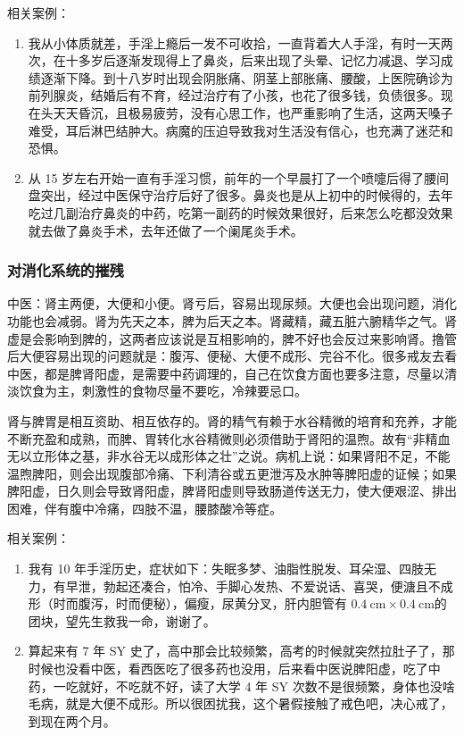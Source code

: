 \documentclass[fontset=founder]{ctexart}
\begin{document}
相关案例：

\begin{enumerate}
    \item 我从小体质就差，手淫上瘾后一发不可收拾，一直背着大人手淫，有时一天两次，在十多岁后逐渐发现得上了鼻炎，后来出现了头晕、记忆力减退、学习成绩逐渐下降。到十八岁时出现会阴胀痛、阴茎上部胀痛、腰酸，上医院确诊为前列腺炎，结婚后有不育，经过治疗有了小孩，也花了很多钱，负债很多。现在头天天昏沉，且极易疲劳，没有心思工作，也严重影响了生活，这两天嗓子难受，耳后淋巴结肿大。病魔的压迫导致我对生活没有信心，也充满了迷茫和恐惧。
    \item 从 15 岁左右开始一直有手淫习惯，前年的一个早晨打了一个喷嚏后得了腰间盘突出，经过中医保守治疗后好了很多。鼻炎也是从上初中的时候得的，去年吃过几副治疗鼻炎的中药，吃第一副药的时候效果很好，后来怎么吃都没效果就去做了鼻炎手术，去年还做了一个阑尾炎手术。
\end{enumerate}

\subsubsection{对消化系统的摧残}

中医：肾主两便，大便和小便。肾亏后，容易出现尿频。大便也会出现问题，消化功能也会减弱。肾为先天之本，脾为后天之本。肾藏精，藏五脏六腑精华之气。肾虚是会影响到脾的，这两者应该说是互相影响的，脾不好也会反过来影响肾。撸管后大便容易出现的问题就是：腹泻、便秘、大便不成形、完谷不化。很多戒友去看中医，都是脾肾阳虚，是需要中药调理的，自己在饮食方面也要多注意，尽量以清淡饮食为主，刺激性的食物尽量不要吃，冷辣要忌口。

肾与脾胃是相互资助、相互依存的。肾的精气有赖于水谷精微的培育和充养，才能不断充盈和成熟，而脾、胃转化水谷精微则必须借助于肾阳的温煦。故有“非精血无以立形体之基，非水谷无以成形体之壮”之说。病机上说：如果肾阳不足，不能温煦脾阳，则会出现腹部冷痛、下利清谷或五更泄泻及水肿等脾阳虚的证候；如果脾阳虚，日久则会导致肾阳虚，脾肾阳虚则导致肠道传送无力，使大便艰涩、排出困难，伴有腹中冷痛，四肢不温，腰膝酸冷等症。

相关案例：

\begin{enumerate}
    \item 我有 10 年手淫历史，症状如下：失眠多梦、油脂性脱发、耳朵湿、四肢无力，有早泄，勃起还凑合，怕冷、手脚心发热、不爱说话、喜哭，便溏且不成形（时而腹泻，时而便秘），偏瘦，尿黄分叉，肝内胆管有 $\SI{0.4}{\centi\metre} \times \SI{0.4}{\centi\metre}$的团块，望先生救我一命，谢谢了。
    \item 算起来有 7 年 SY 史了，高中那会比较频繁，高考的时候就突然拉肚子了，那时候也没看中医，看西医吃了很多药也没用，后来看中医说脾阳虚，吃了中药，一吃就好，不吃就不好，读了大学 4 年 SY 次数不是很频繁，身体也没啥毛病，就是大便不成形。所以很困扰我，这个暑假接触了戒色吧，决心戒了，到现在两个月。
\end{enumerate}
\end{document}
